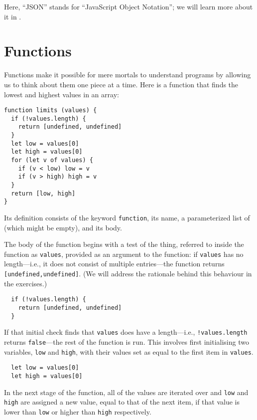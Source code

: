 \noindent
Here,
``JSON'' stands for ``JavaScript Object Notation'';
we will learn more about it in .

\section{Functions}\label{s:basics-functions}

Functions make it possible for mere mortals to understand programs
by allowing us to think about them one piece at a time.
Here is a function that finds the lowest and highest values in an array:

\begin{verbatim}
function limits (values) {
  if (!values.length) {
    return [undefined, undefined]
  }
  let low = values[0]
  let high = values[0]
  for (let v of values) {
    if (v < low) low = v
    if (v > high) high = v
  }
  return [low, high]
}
\end{verbatim}

Its definition consists of the keyword \texttt{function},
its name,
a parameterized list of  (which might be empty),
and its body.

The body of the function begins with a test of the thing,
referred to inside the function as \texttt{values},
provided as an argument to the function:
if \texttt{values} has no length---i.e.,
it does not consist of multiple entries---the function returns \texttt{[undefined,undefined]}.
(We will address the rationale behind this behaviour in the exercises.)

\begin{verbatim}
  if (!values.length) {
    return [undefined, undefined]
  }
\end{verbatim}

\noindent
If that initial check finds that \texttt{values} does have a length---i.e.,
\texttt{!values.length} returns \texttt{false}---the rest of the function is run.
This involves first initialising two variables,
\texttt{low} and \texttt{high},
with their values set as equal to the first item in \texttt{values}.

\begin{verbatim}
  let low = values[0]
  let high = values[0]
\end{verbatim}

In the next stage of the function,
all of the values are iterated over and \texttt{low} and \texttt{high} are
assigned a new value,
equal to that of the next item,
if that value is lower than \texttt{low} or higher than \texttt{high} respectively.


